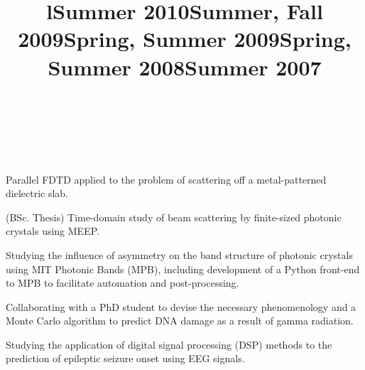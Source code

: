 \documentclass[overlapped,line,10pt,letterpaper]{res}
\begin{document}
\begin{resume}
\begin{format}
\title{l}\\
\\
\body\\
\end{format}
\title{\bfseries Summer 2010}
\dates{}
\begin{position}
Parallel FDTD applied to the problem of scattering off a metal-patterned dielectric slab.
\end{position}
\title{\bfseries Summer, Fall 2009}
\dates{}
\begin{position}
(BSc. Thesis) Time-domain study of beam scattering by finite-sized photonic crystals using MEEP. 
\end{position}
\title{\bfseries Spring, Summer 2009}
\dates{}
\begin{position}
Studying the influence of asymmetry on the band structure of photonic crystals using MIT Photonic Bands (MPB), including development of a Python front-end to MPB to facilitate automation and post-processing.
\end{position}
\title{\bfseries Spring, Summer 2008}
\dates{}
\begin{position}
Collaborating with a PhD student to devise the necessary phenomenology and a Monte Carlo algorithm to predict DNA damage as a result of gamma radiation.
\end{position}
\title{\bfseries Summer 2007}
\dates{}
\begin{position}
Studying the application of digital signal processing (DSP) methods to the prediction of epileptic seizure onset using EEG signals.
\end{position}


\end{resume}
\end{document}
